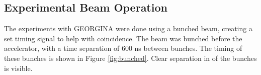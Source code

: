 

\subsection{Experimental Beam Operation}

The experiments with GEORGINA were done using a bunched beam, creating a set timing signal to help with coincidence. The beam was bunched before the accelerator, with a time separation of 600 ns between bunches. The timing of these bunches is shown in Figure \ref{fig:bunched}. Clear separation in of the bunches is visible.



%
% 
% 
